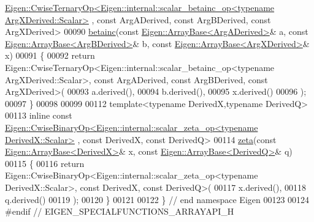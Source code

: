 \begin{DoxyCode}
      \hyperlink{group___core___module_class_eigen_1_1_cwise_ternary_op}{Eigen::CwiseTernaryOp<Eigen::internal::scalar\_betainc\_op<typename ArgXDerived::Scalar>}
      , \textcolor{keyword}{const} ArgADerived, \textcolor{keyword}{const} ArgBDerived, \textcolor{keyword}{const} ArgXDerived>
00090 \hyperlink{namespace_eigen_a726eae91d4e91d8e25cbe55fffa6a92f}{betainc}(\textcolor{keyword}{const} \hyperlink{group___core___module_class_eigen_1_1_array_base}{Eigen::ArrayBase<ArgADerived>}& a, \textcolor{keyword}{const} 
      \hyperlink{group___core___module_class_eigen_1_1_array_base}{Eigen::ArrayBase<ArgBDerived>}& b, \textcolor{keyword}{const} 
      \hyperlink{group___core___module_class_eigen_1_1_array_base}{Eigen::ArrayBase<ArgXDerived>}& x)
00091 \{
00092   \textcolor{keywordflow}{return} Eigen::CwiseTernaryOp<Eigen::internal::scalar\_betainc\_op<typename ArgXDerived::Scalar>, \textcolor{keyword}{const} 
      ArgADerived, \textcolor{keyword}{const} ArgBDerived, \textcolor{keyword}{const} ArgXDerived>(
00093     a.derived(),
00094     b.derived(),
00095     x.derived()
00096   );
00097 \}
00098 
00099 
00112 \textcolor{keyword}{template}<\textcolor{keyword}{typename} DerivedX,\textcolor{keyword}{typename} DerivedQ>
00113 \textcolor{keyword}{inline} \textcolor{keyword}{const} 
      \hyperlink{group___core___module_class_eigen_1_1_cwise_binary_op}{Eigen::CwiseBinaryOp<Eigen::internal::scalar\_zeta\_op<typename DerivedX::Scalar>}
      , \textcolor{keyword}{const} DerivedX, \textcolor{keyword}{const} DerivedQ>
00114 \hyperlink{namespace_eigen_af9555e27540da78d2c4bdd17d3b750b1}{zeta}(\textcolor{keyword}{const} \hyperlink{group___core___module_class_eigen_1_1_array_base}{Eigen::ArrayBase<DerivedX>}& x, \textcolor{keyword}{const} 
      \hyperlink{group___core___module_class_eigen_1_1_array_base}{Eigen::ArrayBase<DerivedQ>}& q)
00115 \{
00116   \textcolor{keywordflow}{return} Eigen::CwiseBinaryOp<Eigen::internal::scalar\_zeta\_op<typename DerivedX::Scalar>, \textcolor{keyword}{const} DerivedX, \textcolor{keyword}{
      const} DerivedQ>(
00117     x.derived(),
00118     q.derived()
00119   );
00120 \}
00121 
00122 \} \textcolor{comment}{// end namespace Eigen}
00123 
00124 \textcolor{preprocessor}{#endif // EIGEN\_SPECIALFUNCTIONS\_ARRAYAPI\_H}
\end{DoxyCode}
